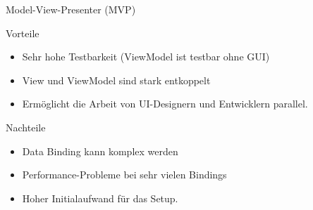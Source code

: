 \begin{frame}{Model-View-Presenter (MVP)}
	\begin{exampleblock}{Vorteile}
		\begin{itemize}
		  \item Sehr hohe Testbarkeit (ViewModel ist testbar ohne GUI)
		  \item View und ViewModel sind stark entkoppelt
		  \item Ermöglicht die Arbeit von UI-Designern und Entwicklern parallel.
		\end{itemize} 
	\end{exampleblock}
	\pause
	\begin{alertblock}{Nachteile}
		\begin{itemize}
		  \item Data Binding kann komplex werden
		  \item Performance-Probleme bei sehr vielen Bindings
		  \item Hoher Initialaufwand für das Setup.
		\end{itemize}
	\end{alertblock}
\end{frame}
